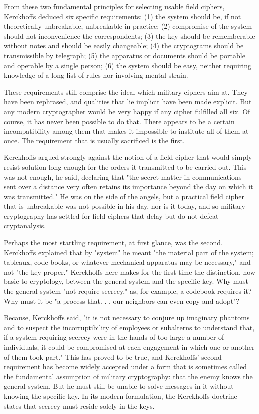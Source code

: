 From these two fundamental principles for selecting usable field ciphers, Kerckhoffs deduced six specific requirements: (1) the system should be, if not theoretically unbreakable, unbreakable in practice; (2) compromise of the system should not inconvenience the correspondents; (3) the key should be rememberable without notes and should be easily changeable; (4) the cryptograms should be transmissible by telegraph; (5) the apparatus or documents should be portable and operable by a single person; (6) the system should be easy, neither requiring knowledge of a long list of rules nor involving mental strain.

These requirements still comprise the ideal which military ciphers aim at. They have been rephrased, and qualities that lie implicit have been made explicit. But any modern cryptographer would be very happy if any cipher fulfilled all six. Of course, it has never been possible to do that. There appears to be a certain incompatibility among them that makes it impossible to institute all of them at once. The requirement that is usually sacrificed is the first.

Kerckhoffs argued strongly against the notion of a field cipher that would simply resist solution long enough for the orders it transmitted to be carried out. This was not enough, he said, declaring that "the secret matter in communications sent over a distance very often retains its importance beyond the day on which it was transmitted." He was on the side of the angels, but a practical field cipher that is unbreakable was not possible in his day, nor is it today, and so military cryptography has settled for field ciphers that delay but do not defeat cryptanalysis.

Perhaps the most startling requirement, at first glance, was the second. Kerckhoffs explained that by "system" he meant "the material part of the system; tableaux, code books, or whatever mechanical apparatus may be necessary," and not "the key proper." Kerckhoffs here makes for the first time the distinction, now basic to cryptology, between the general system and the specific key. Why must the general system "not require secrecy," as, for example, a codebook requires it? Why must it be "a process that. . . our neighbors can even copy and adopt"?

Because, Kerckhoffs said, "it is not necessary to conjure up imaginary phantoms and to suspect the incorruptibility of employees or subalterns to understand that, if a system requiring secrecy were in the hands of too large a number of individuals, it could be compromised at each engagement in which one or another of them took part." This has proved to be true, and Kerckhoffs' second requirement has become widely accepted under a form that is sometimes called the fundamental assumption of military cryptography: that the enemy knows the general system. But he must still be unable to solve messages in it without knowing the specific key. In its modern formulation, the Kerckhoffs doctrine states that secrecy must reside solely in the keys.

